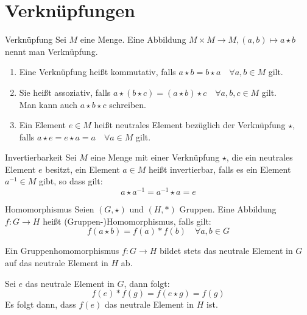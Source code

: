 \chapter{Verknüpfungen}
\begin{definition}{Verknüpfung}
	Sei $M$ eine Menge. Eine Abbildung $M\times M \rightarrow M, (a,b)\mapsto a\star b$ nennt man Verknüpfung.
\end{definition}

\begin{enumerate}
  \item Eine Verknüpfung heißt kommutativ, falls $a\star b = b\star a \quad\forall a,b\in M$ gilt.
  \item Sie heißt assoziativ, falls $a\star(b\star c)=(a\star b)\star c \quad\forall a,b,c\in M$ gilt.\\
  Man kann auch $a\star b\star c$ schreiben.
  \item Ein Element $e\in M$ heißt neutrales Element bezüglich der Verknüpfung $\star$,\\
  falls $a\star e = e\star a=a \quad\forall a\in M$ gilt.
\end{enumerate}

\begin{definition}{Invertierbarkeit}
	Sei $M$ eine Menge mit einer Verknüpfung $\star$, die ein neutrales Element $e$ besitzt, ein Element $a\in M$ heißt invertierbar, falls es ein Element $a^{-1}\in M$ gibt, so dass gilt:
	\begin{equation*}
	  a\star a^{-1} = a^{-1} \star a = e
	\end{equation*}
\end{definition}


\begin{definition}{Homomorphismus}
	Seien $(G,\star)$ und $(H,\ast)$ Gruppen. Eine Abbildung $f:G\rightarrow H$ heißt (Gruppen-)Homomorphismus, falls gilt:
	\begin{equation*}
	  f(a\star b)=f(a)\ast f(b)\quad\forall a,b\in G
	\end{equation*}
\end{definition}

\begin{lemma}{}
  Ein Gruppenhomomorphismus $f:G\rightarrow H$ bildet stets das neutrale Element in $G$ auf das neutrale Element in $H$ ab.
\end{lemma}
\beweis
Sei $e$ das neutrale Element in $G$, dann folgt:
\begin{equation*}
  f(e)\ast f(g)=f(e\star g)=f(g)
\end{equation*}
Es folgt dann, dass $f(e)$ das neutrale Element in $H$ ist.
